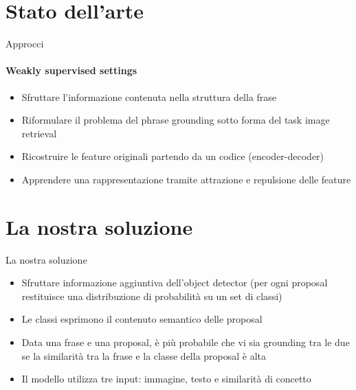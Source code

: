 \documentclass{beamer}
\begin{document}
\section{Stato dell'arte}

\begin{frame}{Approcci}
  \framesubtitle{Weakly supervised settings}
  \begin{itemize}
    \item Sfruttare l'informazione contenuta nella \alert{struttura
    della frase}
    \item Riformulare il problema del phrase grounding sotto forma del
    task \alert{image retrieval}
    \item \alert{Ricostruire} le feature originali partendo da un
    codice (encoder-decoder)
    \item Apprendere una rappresentazione tramite
    \alert{attrazione e repulsione} delle feature
  \end{itemize}
\end{frame}

\section{La nostra soluzione}

\begin{frame}{La nostra soluzione}
  \begin{itemize}
    \item Sfruttare informazione aggiuntiva dell'object detector (per
    ogni proposal restituisce una \alert{distribuzione di probabilità}
    su un set di classi)
    \item Le classi esprimono il \alert{contenuto semantico} delle
    proposal
    \item Data una frase e una proposal, è più probabile che vi sia
    grounding tra le due se la \alert{similarità} tra la frase e la
    classe della proposal è alta
    \vspace{0.5cm}
    \item Il modello utilizza \alert{tre input}: immagine, testo e
    similarità di concetto 
  \end{itemize}
\end{frame}
\end{document}
